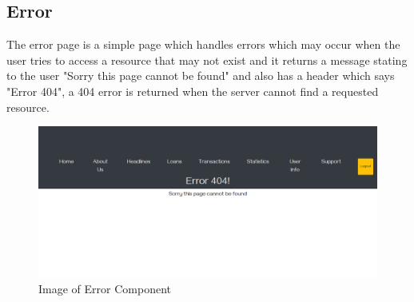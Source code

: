 \subsection{Error}
The error page is a simple page which handles errors which may occur when the user tries to
access a resource that may not exist and it returns a message stating to the user "Sorry this page cannot be found"
and also has a header which says "Error 404", a 404 error is returned when the server cannot find a requested resource.
\begin{figure}[H]
\includegraphics[width=\textwidth]{img/errorcomponent.png}
\caption{Image of Error Component}
\label{fig:Image of Error component}
\end{figure}
